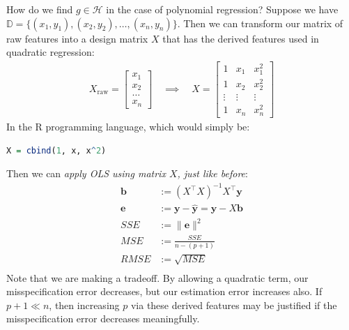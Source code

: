 \documentclass[12pt, a4paper]{article}
\theoremstyle{definition}
\begin{document}
	How do we find $g\in \mathcal{H}$ in the case of polynomial regression? Suppose
	we have $\mathbb{D}=\{(x_1,y_1),(x_2,y_2),\ldots,(x_n,y_n)\}$. Then we can
	transform our matrix of raw features into a design matrix $X$ that has the
	derived features used in quadratic regression:
	\begin{align*}
		X_{\text{raw}} = \begin{bmatrix}
			x_1\\
			x_2\\
			\ldots\\
			x_n
		\end{bmatrix}
		\quad
		\implies
		\quad
		X = \begin{bmatrix}
			1 & x_1 & x_1^2\\
			1 & x_2 & x_2^2\\
			\vdots & \vdots & \vdots\\
			1 & x_n & x_n^2
		\end{bmatrix}
	\end{align*}
	In the R programming language, which would simply be:
	\begin{lstlisting}[language=R]
X = cbind(1, x, x^2)
	\end{lstlisting}
	Then we can \textit{apply OLS using matrix $X$, just like before}:
	\begin{align*}
		\bm{b} &:= (X^\top X)^{-1}X^\top \bm{y}\\
		\bm{e} &:= \bm{y} - \bm{\hat{y}} = \bm{y} - X\bm{b}\\
		SSE &:= \|\bm{e}\|^2\\
		MSE &:= \frac{SSE}{n - (p + 1)}\\
		RMSE &:= \sqrt{MSE}\\
	\end{align*}
	Note that we are making a tradeoff. By allowing a quadratic term, our
	misspecification error decreases, but our estimation error increases also.
	If $p+1\ll n$, then increasing $p$ via these derived features may
	be justified if the misspecification error decreases meaningfully.
\end{document}
